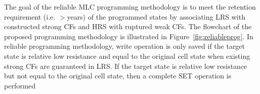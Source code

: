 The goal of the reliable MLC programming methodology is to meet the retention requirement (i.e. $>$years) of the programmed states by associating LRS with constructed strong CFs and HRS with ruptured weak CFs. The flowchart of the proposed programming methodology is illustrated in Figure~\ref{fig:reliableprog}. In reliable programming methodology, write operation is only saved if the target state is relative low resistance and equal to the original cell state when existing strong CFs are guaranteed in LRS. If the target state is relative low resistance but not equal to the original cell state, then a complete SET operation is performed 

